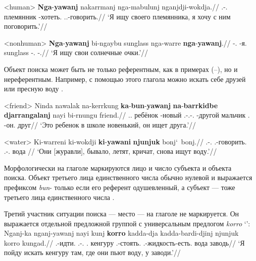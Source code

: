 \ex<human>\begingl
\gla \textbf{Nga}-\textbf{yawanj} nakarrmanj nga-mabulunj nganjdji-wokdja.//
\glb \Fsg.\Real-\yaw.\Np{} племянник \nga-хотеть.\Np{} \Fdu.\Excl.\Fut-говорить.\Np{}//
\glft `Я ищу своего племянника, я хочу с ним поговорить.'//%
\endgl \xe

\ex<nonhuman> \begingl
\gla \textbf{Nga}-\textbf{yawanj} bi-ngaybu sunglass nga-warre \textbf{nga}-\textbf{yawanj}.//
\glb \nga-\yaw.\Np{} \bi-я.\Obl{} sunglass \nga-\warre.\Np{} \nga-\yaw.\Np{}//
\glft `Я ищу свои солнечные очки.'//%
\endgl \xe

Объект поиска может быть не только референтным, как в примерах (--), но и нереферентным. Например, с помощью этого глагола можно искать себе друзей  или пресную воду .

\ex<friend> \begingl
\gla Ninda nawalak na-kerrkung \textbf{ka}-\textbf{bun}-\textbf{yawanj} \textbf{na}-\textbf{barrkidbe} \textbf{djarrangalanj} nayi bi-rnungu friend.//
\glb \Dem.\Prox.\Cli{} ребёнок \Cli-новый \Tsg.\Real-\Tsg.\Obj-\yaw.\Np{} \Cli-другой мальчик \Nm.\Cli{} \bi-он.\Obl{} друг//
\glft `Это ребенок в школе новенький, он ищет друга.'//%
\endgl \xe

\ex<water>\begingl
\gla Ki-warreni ki-wokdji \textbf{ki}-\textbf{yawani} \textbf{njunjuk} bonj\char`~bonj.//
\glb \Tsg.\irrpst-\warre.\irrpst{} \Tsg.\irrpst-говорить.\irrpst{} \Tsg.\irrpst-\yaw.\irrpst{} вода \rdp\bonj{}//
\glft `Они [журавли], бывало, летят, кричат, снова ищут воду.'//
\endgl \xe

Морфологически на глаголе маркируются лицо и число субъекта и объекта поиска. Объект третьего лица единственного числа обычно нулевой и выражается префиксом \textit{bun}- только если его референт одушевленный, а субъект --- тоже третьего лица единственного числа . 


Третий участник ситуации поиска --- место --- на глаголе не маркируется. Он выражается отдельной предложной группой с универсальным предлогом \textit{korro} `\korro':
\begingl
\gla Nganj-ka nganj-yawanj nayi kunj \textbf{korro} kadda-dja kadda-bardi-djinj njunjuk korro kungad.//
\glb \Fsg.\Fut-идти.\Np{} \Fsg.\Fut-\yaw.\Np{} \Nm.\Cli{} кенгуру \korro{} \Tpl.\Real-стоять.\Np{} \Tpl.\Real-жидкость-есть.\Np{} вода \korro{} заводь//
\glft `Я пойду искать кенгуру там, где они пьют воду, у заводи.'//%
\endgl\xe

